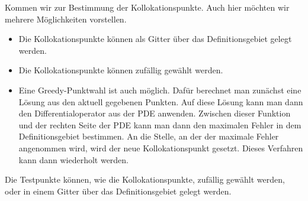Kommen wir zur Bestimmung der Kollokationspunkte. Auch hier möchten wir mehrere Möglichkeiten vorstellen.
\begin{itemize}
\item
Die Kollokationspunkte können als Gitter über das Definitionsgebiet gelegt werden.
\item
Die Kollokationspunkte können zufällig gewählt werden.
\item
Eine Greedy-Punktwahl ist auch möglich. Dafür berechnet man zunächst eine Lösung aus den aktuell gegebenen Punkten. Auf diese Lösung kann man dann den Differentialoperator aus der \ac{PDE} anwenden. Zwischen dieser Funktion und der rechten Seite der \ac{PDE} kann man dann den maximalen Fehler in dem Definitionsgebiet bestimmen. An die Stelle, an der der maximale Fehler angenommen wird, wird der neue Kollokationspunkt gesetzt. Dieses Verfahren kann dann wiederholt werden.
\end{itemize}

Die Testpunkte können, wie die Kollokationspunkte, zufällig gewählt werden, oder in einem Gitter über das Definitionsgebiet gelegt werden.